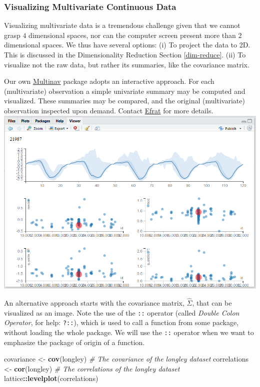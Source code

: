 \documentclass[]{book}
\newenvironment{Shaded}{\begin{snugshade}}{\end{snugshade}}
\newcommand{\KeywordTok}[1]{\textcolor[rgb]{0.13,0.29,0.53}{\textbf{#1}}}
\newcommand{\StringTok}[1]{\textcolor[rgb]{0.31,0.60,0.02}{#1}}
\newcommand{\CommentTok}[1]{\textcolor[rgb]{0.56,0.35,0.01}{\textit{#1}}}
\newcommand{\OperatorTok}[1]{\textcolor[rgb]{0.81,0.36,0.00}{\textbf{#1}}}
\newcommand{\NormalTok}[1]{#1}
\theoremstyle{definition}
\theoremstyle{definition}
\theoremstyle{definition}
\theoremstyle{remark}
\begin{document}
\subsubsection{Visualizing Multivariate Continuous
Data}\label{visualizing-multivariate-continuous-data}

Visualizing multivariate data is a tremendous challenge given that we
cannot grasp \(4\) dimensional spaces, nor can the computer screen
present more than \(2\) dimensional spaces. We thus have several
options: (i) To project the data to 2D. This is discussed in the
Dimensionality Reduction Section \ref{dim-reduce}. (ii) To visualize not
the raw data, but rather its summaries, like the covariance matrix.

Our own \href{https://github.com/EfratVil/MultiNav}{Multinav} package
adopts an interactive approach. For each (multivariate) observation a
simple univariate summary may be computed and visualized. These
summaries may be compared, and the original (multivariate) observation
inspected upon demand. Contact
\href{http://efratvil.github.io/home/index.html}{Efrat} for more
details.\\
\includegraphics{art/multinav.png}

An alternative approach starts with the covariance matrix,
\(\hat \Sigma\), that can be visualized as an image. Note the use of the
\texttt{::} operator (called \emph{Double Colon Operator}, for help:
\texttt{?\textquotesingle{}::\textquotesingle{}}), which is used to call
a function from some package, without loading the whole package. We will
use the \texttt{::} operator when we want to emphasize the package of
origin of a function.

\begin{Shaded}
\begin{Highlighting}[]
\NormalTok{covariance <-}\StringTok{ }\KeywordTok{cov}\NormalTok{(longley) }\CommentTok{# The covariance of the longley dataset}
\NormalTok{correlations <-}\StringTok{ }\KeywordTok{cor}\NormalTok{(longley) }\CommentTok{# The correlations of the longley dataset}
\NormalTok{lattice}\OperatorTok{::}\KeywordTok{levelplot}\NormalTok{(correlations)}
\end{Highlighting}
\end{Shaded}
\end{document}
